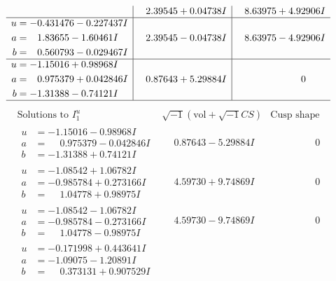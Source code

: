 \documentclass[1p]{elsarticle_modified}
\theoremstyle{definition}
\newcommand{\I}{\sqrt{-1}}
\begin{document}
$$\begin{array}{c|c|c}
 & \phantom{-}2.39545 + 0.04738 I & \phantom{-}8.63975 + 4.92906 I \\ \hline\begin{aligned}
u &= -0.431476 - 0.227437 I \\
a &= \phantom{-}1.83655 - 1.60461 I \\
b &= \phantom{-}0.560793 - 0.029467 I\end{aligned}
 & \phantom{-}2.39545 - 0.04738 I & \phantom{-}8.63975 - 4.92906 I \\ \hline\begin{aligned}
u &= -1.15016 + 0.98968 I \\
a &= \phantom{-}0.975379 + 0.042846 I \\
b &= -1.31388 - 0.74121 I\end{aligned}
 & \phantom{-}0.87643 + 5.29884 I & \phantom{-0.000000 } 0\\
 \hline 
 \end{array}$$\newpage$$\begin{array}{c|c|c}  
\text{Solutions to }I^u_{1}& \I (\text{vol} + \sqrt{-1}CS) & \text{Cusp shape}\\
 \hline 
\begin{aligned}
u &= -1.15016 - 0.98968 I \\
a &= \phantom{-}0.975379 - 0.042846 I \\
b &= -1.31388 + 0.74121 I\end{aligned}
 & \phantom{-}0.87643 - 5.29884 I & \phantom{-0.000000 } 0 \\ \hline\begin{aligned}
u &= -1.08542 + 1.06782 I \\
a &= -0.985784 + 0.273166 I \\
b &= \phantom{-}1.04778 + 0.98975 I\end{aligned}
 & \phantom{-}4.59730 + 9.74869 I & \phantom{-0.000000 } 0 \\ \hline\begin{aligned}
u &= -1.08542 - 1.06782 I \\
a &= -0.985784 - 0.273166 I \\
b &= \phantom{-}1.04778 - 0.98975 I\end{aligned}
 & \phantom{-}4.59730 - 9.74869 I & \phantom{-0.000000 } 0 \\ \hline\begin{aligned}
u &= -0.171998 + 0.443641 I \\
a &= -1.09075 - 1.20891 I \\
b &= \phantom{-}0.373131 + 0.907529 I\end{aligned}

\end{array}$$
\end{document}
